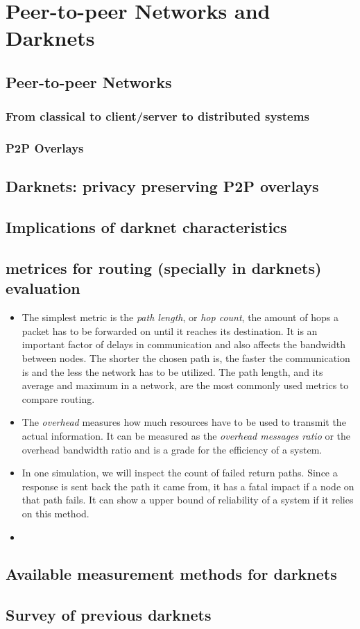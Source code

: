 \chapter{Peer-to-peer Networks and Darknets}

\section{Peer-to-peer Networks}

\subsection{From classical to client/server to distributed systems}

\subsection{P2P Overlays}

\section{Darknets: privacy preserving P2P overlays}


\section{Implications of darknet characteristics}


\section{metrices for routing (specially in darknets) evaluation}

\begin{itemize}
\item The simplest metric is the \emph{path length}, or \emph{hop count}, the amount of hops a packet has to be forwarded on until it reaches its destination. It is an important factor of delays in communication and also affects the bandwidth between nodes. The shorter the chosen path is, the faster the communication is and the less the network has to be utilized. The path length, and its average and maximum in a network, are the most commonly used metrics to compare routing.

\item The \emph{overhead} measures how much resources have to be used to transmit the actual information. It can be measured as the \emph{overhead messages ratio} or the overhead bandwidth ratio and is a grade for the efficiency of a system.

\item In one simulation, we will inspect the count of failed return paths. Since a response is sent back the path it came from, it has a fatal impact if a node on that path fails. It can show a upper bound of reliability of a system if it relies on this method.

\item {}
\end{itemize}

\section{Available measurement methods for darknets}


\section{Survey of previous darknets}


